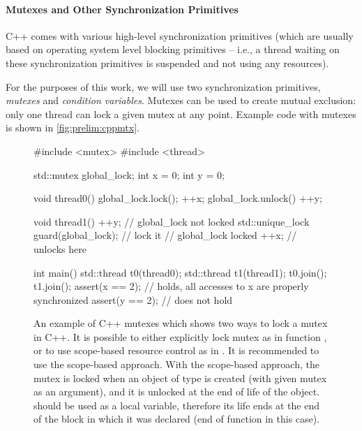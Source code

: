 \paragraph{Mutexes and Other Synchronization Primitives}

C++ comes with various high-level synchronization primitives (which are usually
based on operating system level blocking primitives -- i.e., a thread waiting
on these synchronization primitives is suspended and not using any resources).

For the purposes of this work, we will use two synchronization primitives,
\emph{mutexes} and \emph{condition variables}.
Mutexes can be used to create mutual exclusion: only one thread can lock a
given mutex at any point.
Example code with mutexes is shown in \autoref{fig:prelim:cppmtx}.

\begin{figure}[tp]
    \begin{cppcode}
        #include <mutex>
        #include <thread>

        std::mutex global_lock;
        int x = 0;
        int y = 0;

        void thread0() {
            global_lock.lock();
            ++x;
            global_lock.unlock()
            ++y;
        }

        void thread1() {
            ++y; // global_lock not locked
            std::unique_lock guard(global_lock); // lock it
            // global_lock locked
            ++x;
        } // unlocks here

        int main() {
            std::thread t0(thread0);
            std::thread t1(thread1);
            t0.join(); t1.join();
            assert(x == 2); // holds, all accesses to x are properly synchronized
            assert(y == 2); // does not hold
        }
    \end{cppcode}
    \caption{An example of C++ mutexes which shows two ways to lock a mutex in
    C++.
    It is possible to either explicitly lock mutex as in function
    , or to use scope-based resource control as in
    .
    It is recommended to use the scope-based approach.
    With the scope-based approach, the mutex is locked when an object of type
     is created (with given mutex as an argument),
    and it is unlocked at the end of life of the  object.
     should be used as a local variable, therefore its
    life ends at the end of the block in which it was declared (end of function
     in this case).
    }\label{fig:prelim:cppmtx}
\end{figure}

